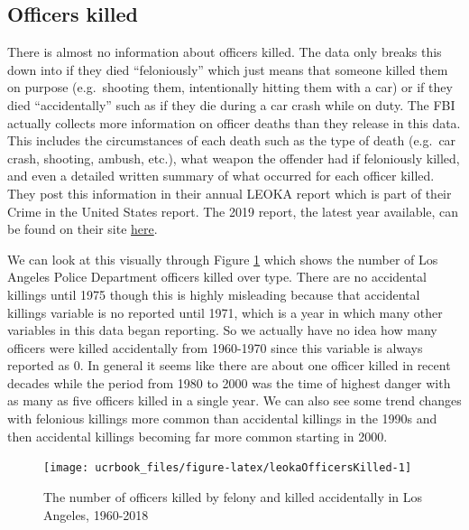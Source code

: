 \documentclass[
  12pt,
  openany]{book}
\begin{document}
\hypertarget{officers-killed}{%
\subsection{Officers killed}\label{officers-killed}}

There is almost no information about officers killed. The data only breaks this down into if they died ``feloniously'' which just means that someone killed them on purpose (e.g.~shooting them, intentionally hitting them with a car) or if they died ``accidentally'' such as if they die during a car crash while on duty. The FBI actually collects more information on officer deaths than they release in this data. This includes the circumstances of each death such as the type of death (e.g.~car crash, shooting, ambush, etc.), what weapon the offender had if feloniously killed, and even a detailed written summary of what occurred for each officer killed. They post this information in their annual LEOKA report which is part of their Crime in the United States report. The 2019 report, the latest year available, can be found on their site \href{https://ucr.fbi.gov/leoka/2019/home}{here}.

We can look at this visually through Figure \ref{fig:leokaOfficersKilled} which shows the number of Los Angeles Police Department officers killed over type. There are no accidental killings until 1975 though this is highly misleading because that accidental killings variable is no reported until 1971, which is a year in which many other variables in this data began reporting. So we actually have no idea how many officers were killed accidentally from 1960-1970 since this variable is always reported as 0. In general it seems like there are about one officer killed in recent decades while the period from 1980 to 2000 was the time of highest danger with as many as five officers killed in a single year. We can also see some trend changes with felonious killings more common than accidental killings in the 1990s and then accidental killings becoming far more common starting in 2000.

\begin{figure}

{\centering \texttt{[image: ucrbook\_files/figure-latex/leokaOfficersKilled-1]} 

}

\caption{The number of officers killed by felony and killed accidentally in Los Angeles, 1960-2018}\label{fig:leokaOfficersKilled}
\end{figure}
\end{document}
